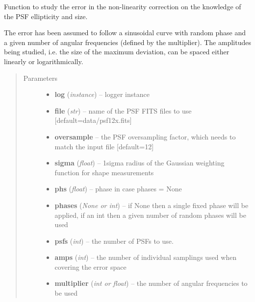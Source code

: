 \documentclass[a4paper,11pt,english]{sphinxmanual}
\begin{document}
\begin{fulllineitems}
\label{reduction:analysis.nonlinearityCalibration.testNonlinearity}
Function to study the error in the non-linearity correction on the knowledge of the PSF ellipticity and size.

The error has been assumed to follow a sinusoidal curve with random phase and a given number of angular
frequencies (defined by the multiplier). The amplitudes being studied, i.e. the size of the maximum deviation,
can be spaced either linearly or logarithmically.
\begin{quote}\begin{description}
\item[{Parameters}] \leavevmode\begin{itemize}
\item {} 
\textbf{log} (\emph{instance}) -- logger instance

\item {} 
\textbf{file} (\emph{str}) -- name of the PSF FITS files to use {[}default=data/psf12x.fits{]}

\item {} 
\textbf{oversample} -- the PSF oversampling factor, which needs to match the input file {[}default=12{]}

\item {} 
\textbf{sigma} (\emph{float}) -- 1sigma radius of the Gaussian weighting function for shape measurements

\item {} 
\textbf{phs} (\emph{float}) -- phase in case phases = None

\item {} 
\textbf{phases} (\emph{None or int}) -- if None then a single fixed phase will be applied, if an int then a given number of random
phases will be used

\item {} 
\textbf{psfs} (\emph{int}) -- the number of PSFs to use.

\item {} 
\textbf{amps} (\emph{int}) -- the number of individual samplings used when covering the error space

\item {} 
\textbf{multiplier} (\emph{int or float}) -- the number of angular frequencies to be used


\end{itemize}
\end{description}
\end{quote}
\end{fulllineitems}
\end{document}
